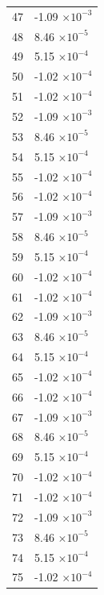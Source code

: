 \documentclass[a4paper,11pt]{article}
\begin{document}
\begin{center}
\begin{longtable}{|R{1.5cm}|R{2.5cm}|}
   47 &        -1.09 $\times 10^{          -3}$ \\
   48 &         8.46 $\times 10^{          -5}$ \\
   49 &         5.15 $\times 10^{          -4}$ \\
   50 &        -1.02 $\times 10^{          -4}$ \\
   51 &        -1.02 $\times 10^{          -4}$ \\
   52 &        -1.09 $\times 10^{          -3}$ \\
   53 &         8.46 $\times 10^{          -5}$ \\
   54 &         5.15 $\times 10^{          -4}$ \\
   55 &        -1.02 $\times 10^{          -4}$ \\
   56 &        -1.02 $\times 10^{          -4}$ \\
   57 &        -1.09 $\times 10^{          -3}$ \\
   58 &         8.46 $\times 10^{          -5}$ \\
   59 &         5.15 $\times 10^{          -4}$ \\
   60 &        -1.02 $\times 10^{          -4}$ \\
   61 &        -1.02 $\times 10^{          -4}$ \\
   62 &        -1.09 $\times 10^{          -3}$ \\
   63 &         8.46 $\times 10^{          -5}$ \\
   64 &         5.15 $\times 10^{          -4}$ \\
   65 &        -1.02 $\times 10^{          -4}$ \\
   66 &        -1.02 $\times 10^{          -4}$ \\
   67 &        -1.09 $\times 10^{          -3}$ \\
   68 &         8.46 $\times 10^{          -5}$ \\
   69 &         5.15 $\times 10^{          -4}$ \\
   70 &        -1.02 $\times 10^{          -4}$ \\
   71 &        -1.02 $\times 10^{          -4}$ \\
   72 &        -1.09 $\times 10^{          -3}$ \\
   73 &         8.46 $\times 10^{          -5}$ \\
   74 &         5.15 $\times 10^{          -4}$ \\
   75 &        -1.02 $\times 10^{          -4}$ \\

\end{longtable}
\end{center}
\end{document}
